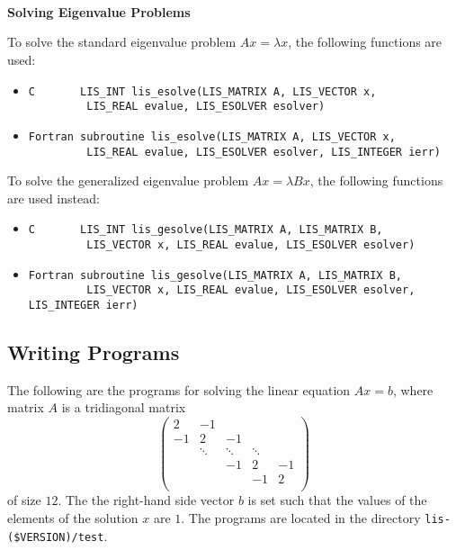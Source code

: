 \documentclass[a4paper]{article}
\begin{document}
\\ \\ \\
\noindent
{\bf Solving Eigenvalue Problems}

To solve the standard eigenvalue problem $Ax = \lambda x$, the following functions are used:
\begin{itemize}
\item \verb|C       LIS_INT lis_esolve(LIS_MATRIX A, LIS_VECTOR x,|\\ 
      \verb|         LIS_REAL evalue, LIS_ESOLVER esolver)|
\item \verb|Fortran subroutine lis_esolve(LIS_MATRIX A, LIS_VECTOR x,|\\
      \verb|         LIS_REAL evalue, LIS_ESOLVER esolver, LIS_INTEGER ierr)|
\end{itemize}
To solve the generalized eigenvalue problem $Ax = \lambda Bx$, the following functions are used instead:
\begin{itemize}
\item \verb|C       LIS_INT lis_gesolve(LIS_MATRIX A, LIS_MATRIX B,|\\ 
      \verb|         LIS_VECTOR x, LIS_REAL evalue, LIS_ESOLVER esolver)|
\item \verb|Fortran subroutine lis_gesolve(LIS_MATRIX A, LIS_MATRIX B,|\\
      \verb|         LIS_VECTOR x, LIS_REAL evalue, LIS_ESOLVER esolver, LIS_INTEGER ierr)|
\end{itemize}

\subsection{Writing Programs}
\label{sec:testprog3}
The following are the programs for solving the linear equation $Ax = b$,
where matrix $A$ is a tridiagonal matrix 
\[
\left(
\begin{array}{ccccc}
2 & -1 &   &  &   \\
-1 & 2 & -1 &  &   \\
  & \ddots  & \ddots  & \ddots  &   \\
  &   & -1 & 2 & -1 \\
  &   &   & -1 & 2 \\
\end{array}
\right)
\]
of size $12$.
The the right-hand side vector $b$ is set such that the values of the elements of the solution $x$ are $1$. 
The programs are located in the directory \verb|lis-($VERSION)/test|. 
\end{document}
